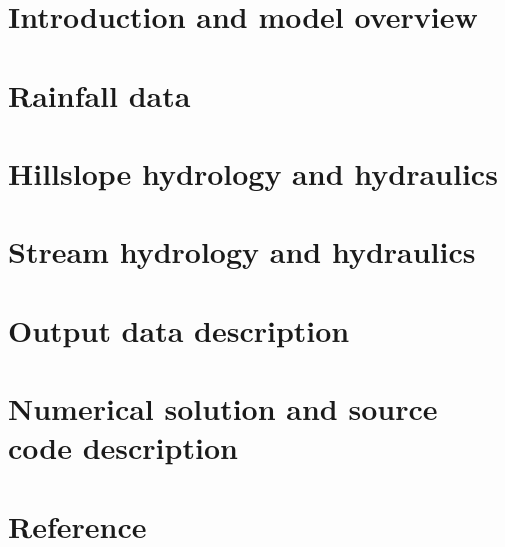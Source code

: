 \section{Introduction and model overview}



\FloatBarrier
\section{Rainfall data}



\FloatBarrier
\section{Hillslope hydrology and hydraulics}



\FloatBarrier
\section{Stream hydrology and hydraulics}



\FloatBarrier
\section{Output data description}



\FloatBarrier
\section{Numerical solution and source code description}



\FloatBarrier
\section{Reference}




%
%

%
